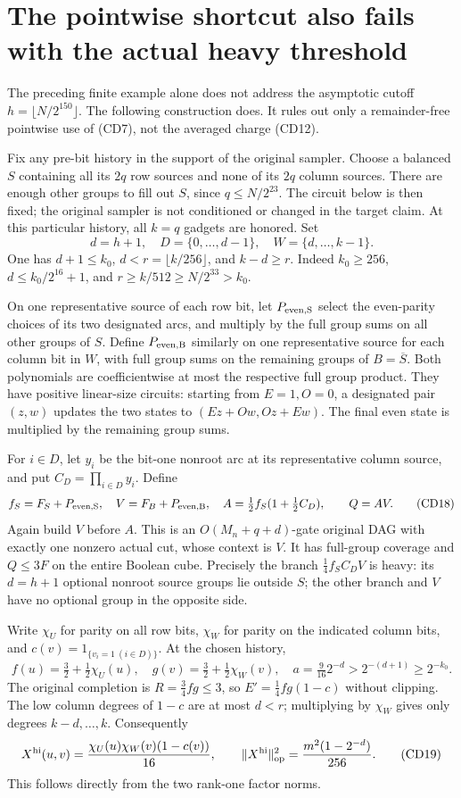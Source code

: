 \documentclass[11pt]{article}
\newcommand{\op}{\mathrm{op}}
\begin{document}
\section{The pointwise shortcut also fails with the actual heavy threshold}
The preceding finite example alone does not address the asymptotic
cutoff $h=\lfloor N/2^{150}\rfloor$. The following construction does.
It rules out only a remainder-free pointwise use of (CD7), not the
averaged charge (CD12).

Fix any pre-bit history in the support of the original sampler.
Choose a balanced $S$ containing all its $2q$ row sources and none
of its $2q$ column sources. There are enough other groups to fill
out $S$, since $q\le N/2^{23}$. The circuit below is then fixed;
the original sampler is not conditioned or changed in the target
claim. At this particular history, all $k=q$ gadgets are honored.
Set
\[
 d=h+1,\quad D=\{0,\ldots,d-1\},\quad
 W=\{d,\ldots,k-1\}.
\]
One has $d+1\le k_0$, $d<r=\lfloor k/256\rfloor$, and
$k-d\ge r$. Indeed $k_0\ge256$,
$d\le k_0/2^{16}+1$, and
$r\ge k/512\ge N/2^{33}>k_0$.

On one representative source of each row bit, let
$P_{\rm even,S}$ select the even-parity choices of its two
designated arcs, and multiply by the full group sums on all
other groups of $S$. Define $P_{\rm even,B}$ similarly on one
representative source for each column bit in $W$, with full group
sums on the remaining groups of $B=\overline S$.
Both polynomials are coefficientwise at most the respective full
group product. They have positive linear-size circuits: starting
from $E=1,O=0$, a designated pair $(z,w)$ updates the two states to
$(Ez+Ow,Oz+Ew)$. The final even state is multiplied by the
remaining group sums.

For $i\in D$, let $y_i$ be the bit-one nonroot arc at its
representative column source, and put $C_D=\prod_{i\in D}y_i$.
Define
\[
 f_S=F_S+P_{\rm even,S},\quad
 V=F_B+P_{\rm even,B},\quad
 A=\tfrac12 f_S(1+\tfrac12 C_D),\qquad Q=AV.             \tag{CD18}
\]
Again build $V$ before $A$. This is an $O(M_n+q+d)$-gate
original DAG with exactly one nonzero actual cut, whose context
is $V$. It has full-group coverage and $Q\le3F$ on the entire
Boolean cube. Precisely the branch $\tfrac14f_SC_DV$ is heavy:
its $d=h+1$ optional nonroot source groups lie outside $S$;
the other branch and $V$ have no optional group in the opposite side.

Write $\chi_U$ for parity on all row bits, $\chi_W$ for parity
on the indicated column bits, and
$c(v)=1_{\{v_i=1\ (i\in D)\}}$. At the chosen history,
\[
 f(u)=\tfrac32+\tfrac12\chi_U(u),\quad
 g(v)=\tfrac32+\tfrac12\chi_W(v),\quad
 a=\tfrac9{16}2^{-d}>2^{-(d+1)}\ge2^{-k_0}.
\]
The original completion is $R=\tfrac34fg\le3$, so
$E'=\tfrac14fg(1-c)$ without clipping.
The low column degrees of $1-c$ are at most $d<r$; multiplying
by $\chi_W$ gives only degrees $k-d,\ldots,k$.
Consequently
\[
 X^{\rm hi}(u,v)=\frac{\chi_U(u)\chi_W(v)(1-c(v))}{16},
 \qquad
 \|X^{\rm hi}\|_{\op}^2
          =\frac{m^2(1-2^{-d})}{256}.                    \tag{CD19}
\]
This follows directly from the two rank-one factor norms.
\end{document}
